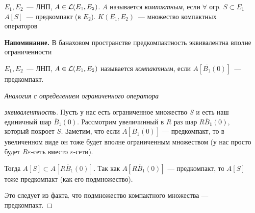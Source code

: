 \begin{definition}
    $E_1, E_2$~--- ЛНП, $A \in \mathcal{L}(E_1, E_2)$. $A$ называется \textit{компактным}, если $\forall$ огр. $S \subset E_1$ $A[S]$~--- предкомпакт (в $E_2$). $K(E_1, E_2)$~--- множество компактных операторов
\end{definition}

\noindent\textbf{Напоминание.}
В банаховом пространстве предкомпактность эквивалентна вполне ограниченности

\begin{definition} %
$E_1, E_2$~--- ЛНП, $A  \in \mathcal{L}(E_1, E_2)$ называется \textit{компактным}, если 
$A\left[ \overline{B_1}(0) \right]$~--- предкомпакт.

\textit{Аналогия с определением ограниченного оператора}
\end{definition}

\begin{proof}[эквивалентность]
Пусть у нас есть ограниченное множество $S$ и есть наш единичный шар $\overline{B}_1(0)$. Рассмотрим увеличинный в $R$ раз шар $R\overline{B}_1(0)$, который покроет $S$. Заметим, что если $A\left[\overline{B}_1(0) \right]$ --- предкомпакт, то в увеличенном виде он тоже будет вполне ограниченным множеством (у нас просто будет $R\varepsilon\text{-сеть вместо } \varepsilon\text{-сети}$).

Тогда $A[S] \subset A\left[R\overline{B}_1(0) \right]$. Так как $A\left[ R\overline{B}_1(0) \right]$ --- предкомпакт, то $A[S]$ тоже предкомпакт (как его подмножество).

Это следует из факта, что подмножество компактного множества --- предкомпакт.
\end{proof}

